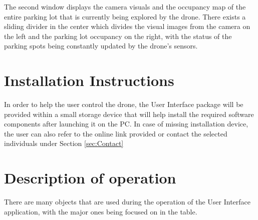 \documentclass[12pt]{article}
\begin{document}
The second window displays the camera visuals and the occupancy map of the entire parking lot that is currently being explored by the drone. There exists a sliding divider in the center which divides the visual images from the camera on the left and the parking lot occupancy on the right, with the status of the parking spots being constantly updated by the drone's sensors.

\section{Installation Instructions}

In order to help the user control the drone, the User Interface package will be provided within a small storage device that will help install the required software components after launching it on the PC. In case of missing installation device, the user can also refer to the online link provided or contact the selected individuals under Section \ref{sec:Contact}

\section{Description of operation}

There are many objects that are used during the operation of the User Interface application, with the major ones being focused on in the  table.
\end{document}

